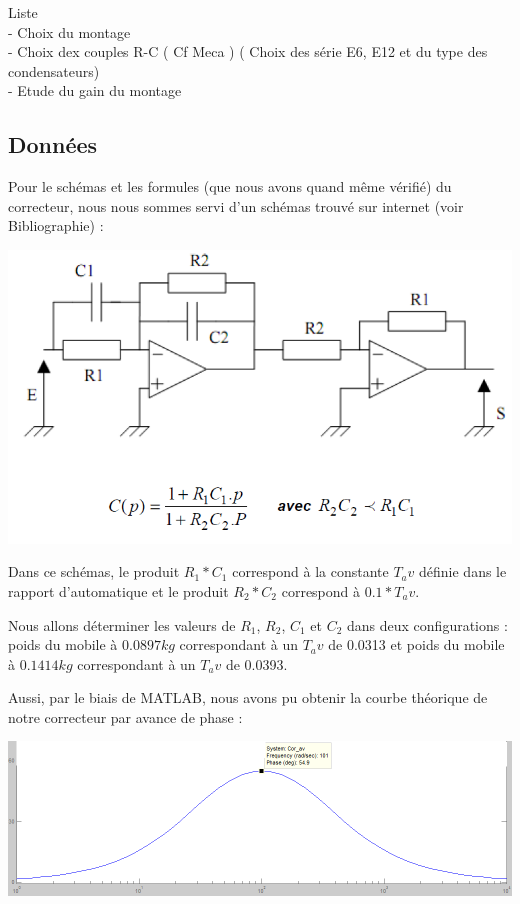 \documentclass[11pt, french]{article} %
\begin{document}
Liste
\\- Choix du montage
\\- Choix dex couples R-C ( Cf Meca ) ( Choix des série E6, E12 et du type des condensateurs)
\\- Etude du gain du montage


\subsection{Données}

\noindent
Pour le schémas et les formules (que nous avons quand même vérifié) du correcteur, nous nous sommes servi d'un schémas trouvé sur internet (voir Bibliographie) :

\begin{center}
\includegraphics[width = 15cm]{SolutionAnalogique/Avph.png} 
\end{center}

\vspace{0.5cm}

Dans ce schémas, le produit $R_1*C_1$ correspond à la constante $ T_av$ définie dans le rapport d'automatique et le produit $R_2*C_2$ correspond à $0.1*T_av$.


Nous allons déterminer les valeurs de $R_1$, $R_2$, $C_1$ et $C_2$ dans deux configurations : poids du mobile à $0.0897 kg$ correspondant à un $T_av$ de 0.0313 et poids du mobile à $0.1414 kg$ correspondant à un $T_av$ de 0.0393.


Aussi, par le biais de MATLAB, nous avons pu obtenir la courbe théorique de notre correcteur par avance de phase :

\begin{center}
\includegraphics[width = 15cm]{SolutionAnalogique/aphmat.png} 
\end{center}
\end{document}
